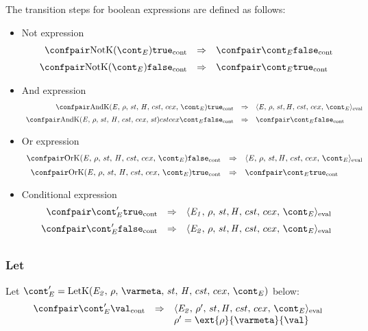 \documentclass{article}
\begin{document}
The transition steps for boolean expressions are defined as follows:
\begin{itemize}
\item Not expression\\
\[
  \begin{array}{rll}
	\cesktrans{
		\contconf{\NotK{\econt}}{\true}}{
		\contconf{\econt}{\false}}
		\\[2mm]

	\cesktrans{
		\contconf{\NotK{\econt}}{\false}}{
		\contconf{\econt}{\true}}
  \end{array}
\]
\item And expression\\
\[
  \begin{array}{rcl}
	\cesktrans{
		\contconf{\AndK{\expressionmeta}{\env}{\econt}}{\true}}{
		\evalconf{\expressionmeta}{\env}{\strace}{\cstrace}{\cex}{\econt}}
		\\[2mm]

	\cesktrans{
		\contconf{\AndK{\expressionmeta}{\env}{\strace}{\cstrace}{\cex}{\econt}}{\false}}{
		\contconf{\econt}{\false}}
  \end{array}
\]
\item Or expression\\
\[
  \begin{array}{rcl}
	\cesktrans{
		\contconf{\OrK{\expressionmeta}{\env}{\econt}}{\false}}{
		\evalconf{\expressionmeta}{\env}{\strace}{\cstrace}{\cex}{\econt}}
		\\[2mm]

	\cesktrans{
		\contconf{\OrK{\expressionmeta}{\env}{\econt}}{\true}}{
		\contconf{\econt}{\true}}
  \end{array}
\]
\item Conditional expression\\
\[
  \begin{array}{rcl}
	\cesktrans{
		\contconf{\econt'}{\true}}{
		\evalconf{\expri{1}}{\env}{\strace}{\cstrace}{\cex}{\econt}}
		\\[2mm]

	\cesktrans{
		\contconf{\econt'}{\false}}{
		\evalconf{\expri{2}}{\env}{\strace}{\cstrace}{\cex}{\econt}}
		\\[2mm]
  \end{array}
\]

\end{itemize}
\subsubsection{Let}
Let $\econt' = \LetK{\expri{2}}{\env}{\varmeta}{\econt}$ below:
\[
  \begin{array}{rcl}
	\cesktrans{
		\contconf{\econt'}{\val}}{
		\evalconf{\expri{2}}{\env'}{\strace}{\cstrace}{\cex}{\econt}}
		\\
	&&\env'=\ext{\env}{\varmeta}{\val}\\[2mm]
  \end{array}
\]
\end{document}
